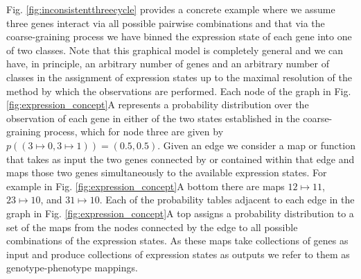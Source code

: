 Fig. \ref{fig:inconsistentthreecycle} provides a concrete example where we assume three genes interact via all possible pairwise combinations and that via the coarse-graining process we have binned the expression state of each gene into one of two classes. Note that this graphical model is completely general and we can have, in principle, an arbitrary number of genes and an arbitrary number of classes in the assignment of expression states up to the maximal resolution of the method by which the observations are performed. Each node of the graph in Fig. \ref{fig:expression_concept}A represents a probability distribution over the observation of each gene in either of the two states established in the coarse-graining process, which for node three are given by $p((3 \mapsto 0, 3 \mapsto 1))=(0.5,0.5)$. Given an edge we consider a map or function that takes as input the two genes connected by or contained within that edge and maps those two genes simultaneously to the available expression states. For example in Fig. \ref{fig:expression_concept}A bottom there are maps $12 \mapsto 11$, $23 \mapsto 10$, and $31 \mapsto 10$. Each of the probability tables adjacent to each edge in the graph in Fig. \ref{fig:expression_concept}A top assigns a probability distribution to a set of the maps from the nodes connected by the edge to all possible combinations of the expression states. As these maps take collections of genes as input and produce collections of expression states as outputs we refer to them as genotype-phenotype mappings.

